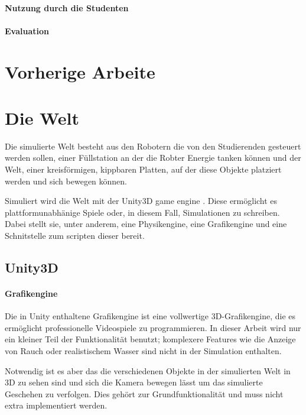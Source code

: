 \documentclass[
    12pt,
    bibliography=totoc,
    ngerman
]{scrartcl}
\begin{document}

\paragraph{Nutzung durch die Studenten} 

\paragraph{Evaluation}

\clearpage
\section{Vorherige Arbeite}


\clearpage
\section{Die Welt}
Die simulierte Welt besteht aus den Robotern die von den Studierenden gesteuert werden sollen, einer F{\"{u}}llstation an der die Robter Energie tanken k{\"{o}}nnen und
der Welt, einer kreisf{\"{o}}rmigen, kippbaren Platten, auf der diese Objekte platziert werden und sich bewegen k{\"{o}}nnen.

Simuliert wird die Welt mit der Unity3D game engine . Diese erm{\"{o}}glicht es plattformunabh{\"{a}}nige Spiele oder, in diesem Fall, Simulationen zu schreiben.
Dabei stellt sie, unter anderem, eine Physikengine, eine Grafikengine und eine Schnitstelle zum scripten dieser bereit. 

\subsection{Unity3D}
\paragraph{Grafikengine}
Die in Unity enthaltene Grafikengine ist eine vollwertige 3D-Grafikengine, die es erm{\"{o}}glicht professionelle Videospiele zu programmieren. In dieser Arbeit wird nur
ein kleiner Teil der Funktionalit{\"{a}}t benutzt; komplexere Features wie die Anzeige von Rauch oder realistischem Wasser sind nicht in der Simulation enthalten.

Notwendig ist es aber das die verschiedenen Objekte in der simulierten Welt in 3D zu sehen sind und sich die Kamera bewegen l{\"{a}}sst um das simulierte Geschehen zu
verfolgen. Dies geh{\"{o}}rt zur Grundfunktionalit{\"{a}}t und muss nicht extra implementiert werden.
\end{document}
